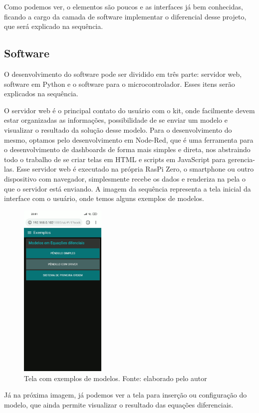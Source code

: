 \documentclass[journal]{IEEEtranTIE}
\begin{document}
Como podemos ver, o elementos são poucos e as interfaces já bem conhecidas, ficando a cargo da camada de software implementar o diferencial desse projeto, que será explicado na sequência.

\subsection{Software}

O desenvolvimento do software pode ser dividido em três parte: servidor web, software em Python e o software para o microcontrolador. Esses itens serão explicados na sequência.

O servidor web é o principal contato do usuário com o kit, onde facilmente devem estar organizadas as informações, possibilidade de se enviar um modelo e visualizar o resultado da solução desse modelo. Para o desenvolvimento do mesmo, optamos pelo desenvolvimento em Node-Red, que é uma ferramenta para o desenvolvimento de dashboards de forma mais simples e direta, nos abstraindo todo o trabalho de se criar telas em HTML e scripts em JavaScript para gerencia-las. Esse servidor web é executado na própria RasPi Zero, o smartphone ou outro dispositivo com navegador, simplesmente recebe os dados e renderiza na pela o que o servidor está enviando. A imagem da sequência representa a tela inicial da interface com o usuário, onde temos alguns exemplos de modelos.

\begin{figure}[H]
	\centering
	\includegraphics[width=4.1cm]{img/examples.png}
    \caption{Tela com exemplos de modelos. Fonte: elaborado pelo autor}
    \label{fig:examples}
\end{figure}

Já na próxima imagem, já podemos ver a tela para inserção ou configuração do modelo, que ainda permite visualizar o resultado das equações diferenciais.
\end{document}

